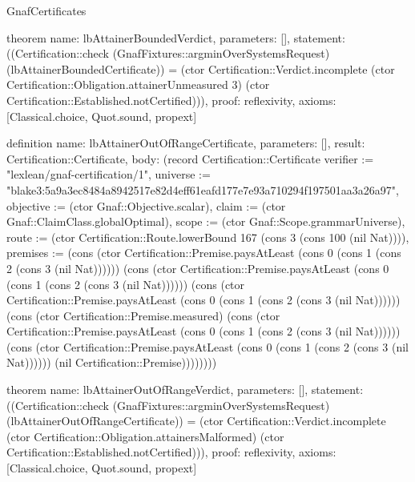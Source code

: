 \begin{lexlean}{GnafCertificates}
\begin{semanticmodule}
theorem{
  name: lbAttainerBoundedVerdict,
  parameters: [],
  statement: ((Certification::check (GnafFixtures::argminOverSystemsRequest) (lbAttainerBoundedCertificate)) = (ctor Certification::Verdict.incomplete (ctor Certification::Obligation.attainerUnmeasured 3) (ctor Certification::Established.notCertified))),
  proof: reflexivity{},
  axioms: [Classical.choice, Quot.sound, propext]
}

definition{
  name: lbAttainerOutOfRangeCertificate,
  parameters: [],
  result: Certification::Certificate,
  body: (record Certification::Certificate {verifier := "lexlean/gnaf-certification/1", universe := "blake3:5a9a3ec8484a8942517e82d4eff61eafd177e7e93a710294f197501aa3a26a97", objective := (ctor Gnaf::Objective.scalar), claim := (ctor Gnaf::ClaimClass.globalOptimal), scope := (ctor Gnaf::Scope.grammarUniverse), route := (ctor Certification::Route.lowerBound 167 (cons 3 (cons 100 (nil Nat)))), premises := (cons (ctor Certification::Premise.paysAtLeast (cons 0 (cons 1 (cons 2 (cons 3 (nil Nat)))))) (cons (ctor Certification::Premise.paysAtLeast (cons 0 (cons 1 (cons 2 (cons 3 (nil Nat)))))) (cons (ctor Certification::Premise.paysAtLeast (cons 0 (cons 1 (cons 2 (cons 3 (nil Nat)))))) (cons (ctor Certification::Premise.measured) (cons (ctor Certification::Premise.paysAtLeast (cons 0 (cons 1 (cons 2 (cons 3 (nil Nat)))))) (cons (ctor Certification::Premise.paysAtLeast (cons 0 (cons 1 (cons 2 (cons 3 (nil Nat)))))) (nil Certification::Premise)))))))})
}

theorem{
  name: lbAttainerOutOfRangeVerdict,
  parameters: [],
  statement: ((Certification::check (GnafFixtures::argminOverSystemsRequest) (lbAttainerOutOfRangeCertificate)) = (ctor Certification::Verdict.incomplete (ctor Certification::Obligation.attainersMalformed) (ctor Certification::Established.notCertified))),
  proof: reflexivity{},
  axioms: [Classical.choice, Quot.sound, propext]
}


\end{semanticmodule}
\end{lexlean}
